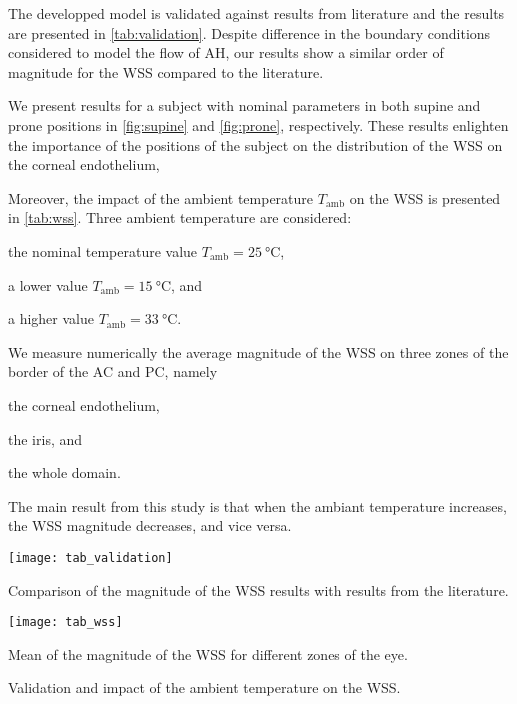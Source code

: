 \documentclass[a4paper]{article}
\begin{document}
The developped model is validated against results from literature and the results are presented in \cref{tab:validation}.
Despite difference in the boundary conditions considered to model the flow of AH, our results show a similar order of magnitude for the WSS compared to the literature.

We present results for a subject with nominal parameters in both supine and prone positions in \cref{fig:supine} and \cref{fig:prone}, respectively.
These results enlighten the importance of the positions of the subject on the distribution of the WSS on the corneal endothelium,


Moreover, the impact of the ambient temperature $T_\text{amb}$ on the WSS is presented in \cref{tab:wss}.
Three ambient temperature are considered:
\begin{inparaenum}[\it (i)]
\item the nominal temperature value $T_\text{amb} = \SI{25}{\celsius}$,
\item a lower value $T_\text{amb} = \SI{15}{\celsius}$, and
\item a higher value $T_\text{amb} = \SI{33}{\celsius}$.
\end{inparaenum}
We measure numerically the average magnitude of the WSS on three zones of the border of the AC and PC, namely
\begin{inparaenum}[\it (i)]
\item the corneal endothelium,
\item the iris, and
\item the whole domain.
\end{inparaenum}
The main result from this study is that when the ambiant temperature increases, the WSS magnitude decreases, and vice versa.

\begin{table}
    \centering

    \begin{subtable}{0.5\textwidth}
        \texttt{[image: tab\_validation]}
        \caption{Comparison of the magnitude of the WSS results with results from the literature.}
        \label{tab:validation}
    \end{subtable}
    \begin{subtable}{0.45\textwidth}
        \centering
        \texttt{[image: tab\_wss]}
        \caption{Mean of the magnitude of the WSS for different zones of the eye.}
        \label{tab:wss}
    \end{subtable}
    \caption{Validation and impact of the ambient temperature on the WSS.}
\end{table}
\end{document}

